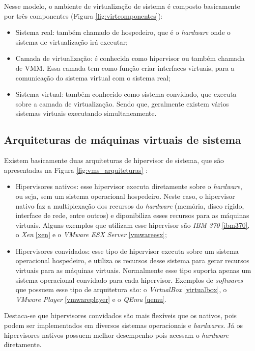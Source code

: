 Nesse modelo, o ambiente de virtualização de sistema é composto basicamente por três componentes (Figura \ref{fig:virtcomponentes}):
\begin{itemize}
 \item Sistema real: também chamado de hospedeiro, que é o \textit{hardware} onde o sistema de virtualização irá executar;
 \item Camada de virtualização: é conhecida como hipervisor ou também chamada de \ac{VMM}. Essa camada tem como função criar interfaces 
 virtuais, para a comunicação do sistema virtual com o sistema real;
 \item Sistema virtual: também conhecido como sistema convidado, que executa sobre a camada de virtualização. Sendo que, geralmente
 existem vários sistemas virtuais executando simultaneamente.
\end{itemize}

\subsection{Arquiteturas de máquinas virtuais de sistema}
\label{section:virtarquit}

Existem basicamente duas arquiteturas de hipervisor de sistema, que são apresentadas na Figura \ref{fig:vms_arquiteturas} \cite{maziero2013}:
\begin{itemize}
 \item Hipervisores nativos: esse hipervisor executa diretamente sobre o \textit{hardware}, ou seja, sem um sistema operacional
 hospedeiro. Neste caso, o hipervisor nativo faz a multiplexação dos recursos do \textit{hardware} (memória, disco rígido, interface de rede, 
 entre outros) e diponibiliza esses recursos para as máquinas virtuais. Alguns exemplos que utilizam esse hipervisor são 
 \textit{IBM 370} \ref{ibm370}, o \textit{Xen} \ref{xen} e o \textit{VMware ESX Server} \ref{vmwareesx};
 \item Hipervisores convidados: esse tipo de hipervisor executa sobre um sistema operacional hospedeiro, e utiliza os recursos 
 desse sistema para gerar recursos virtuais para as máquinas virtuais. Normalmente esse tipo suporta apenas um sistema 
 operacional convidado para cada hipervisor. Exemplos de \textit{softwares} que possuem esse tipo de arquitetura são: o 
 \textit{VirtualBox} \ref{virtualbox}, o \textit{VMware Player} \ref{vmwareplayer} e o \textit{QEmu} \ref{qemu}.
\end{itemize}

Destaca-se que hipervisores convidados são mais flexíveis que os nativos, pois podem ser implementados em diversos sistemas operacionais 
e \textit{hardwares}. Já os hipervisores nativos possuem melhor desempenho pois acessam o \textit{hardware} diretamente.

